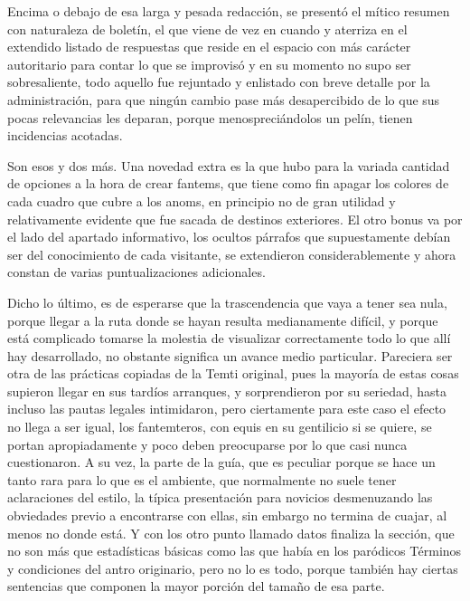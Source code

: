 \documentclass[
]{book}
\begin{document}
Encima o debajo de esa larga y pesada redacción, se presentó el mítico resumen con naturaleza de boletín, el que viene de vez en cuando y aterriza en el extendido listado de respuestas que reside en el espacio con más carácter autoritario para contar lo que se improvisó y en su momento no supo ser sobresaliente, todo aquello fue rejuntado y enlistado con breve detalle por la administración, para que ningún cambio pase más desapercibido de lo que sus pocas relevancias les deparan, porque menospreciándolos un pelín, tienen incidencias acotadas.

Son esos y dos más. Una novedad extra es la que hubo para la variada cantidad de opciones a la hora de crear fantems, que tiene como fin apagar los colores de cada cuadro que cubre a los anoms, en principio no de gran utilidad y relativamente evidente que fue sacada de destinos exteriores. El otro bonus va por el lado del apartado informativo, los ocultos párrafos que supuestamente debían ser del conocimiento de cada visitante, se extendieron considerablemente y ahora constan de varias puntualizaciones adicionales.

Dicho lo último, es de esperarse que la trascendencia que vaya a tener sea nula, porque llegar a la ruta donde se hayan resulta medianamente difícil, y porque está complicado tomarse la molestia de visualizar correctamente todo lo que allí hay desarrollado, no obstante significa un avance medio particular. Pareciera ser otra de las prácticas copiadas de la Temti original, pues la mayoría de estas cosas supieron llegar en sus tardíos arranques, y sorprendieron por su seriedad, hasta incluso las pautas legales intimidaron, pero ciertamente para este caso el efecto no llega a ser igual, los fantemteros, con equis en su gentilicio si se quiere, se portan apropiadamente y poco deben preocuparse por lo que casi nunca cuestionaron. A su vez, la parte de la guía, que es peculiar porque se hace un tanto rara para lo que es el ambiente, que normalmente no suele tener aclaraciones del estilo, la típica presentación para novicios desmenuzando las obviedades previo a encontrarse con ellas, sin embargo no termina de cuajar, al menos no donde está. Y con los otro punto llamado datos finaliza la sección, que no son más que estadísticas básicas como las que había en los paródicos Términos y condiciones del antro originario, pero no lo es todo, porque también hay ciertas sentencias que componen la mayor porción del tamaño de esa parte.
\end{document}
